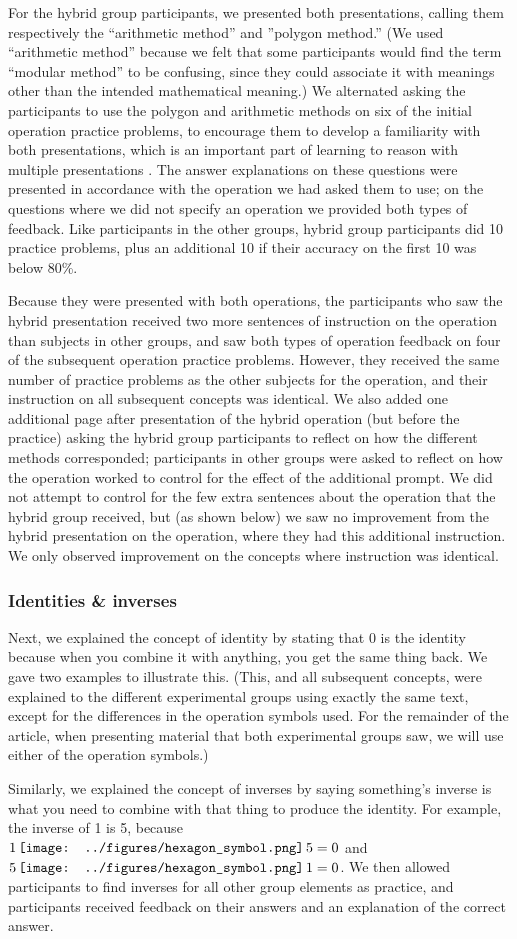 \documentclass[man,10pt]{apa6}
\newcommand{\hex}{\,\vcenter{\hbox{\texttt{[image: ../figures/hexagon\_symbol.png]}}}\,}
\begin{document}
For the hybrid group participants, we presented both presentations, calling them respectively the ``arithmetic method'' and ''polygon method.'' (We used ``arithmetic method'' because we felt that some participants would find the term ``modular method'' to be confusing, since they could associate it with meanings other than the intended mathematical meaning.) We alternated asking the participants to use the polygon and arithmetic methods on six of the initial operation practice problems, to encourage them to develop a familiarity with both presentations, which is an important part of learning to reason with multiple presentations \cite{Ainsworth2006}. The answer explanations on these questions were presented in accordance with the operation we had asked them to use; on the questions where we did not specify an operation we provided both types of feedback. Like participants in the other groups, hybrid group participants did 10 practice problems, plus an additional 10 if their accuracy on the first 10 was below 80\%. \par
Because they were presented with both operations, the participants who saw the hybrid presentation received two more sentences of instruction on the operation than subjects in other groups, and saw both types of operation feedback on four of the subsequent operation practice problems. However, they received the same number of practice problems as the other subjects for the operation, and their instruction on all subsequent concepts was identical. We also added one additional page after presentation of the hybrid operation (but before the practice) asking the hybrid group participants to reflect on how the different methods corresponded; participants in other groups were asked to reflect on how the operation worked to control for the effect of the additional prompt. We did not attempt to control for the few extra sentences about the operation that the hybrid group received, but (as shown below) we saw no improvement from the hybrid presentation on the operation, where they had this additional instruction. We only observed improvement on the concepts where instruction was identical.\par 
\subsubsection{Identities \& inverses}
Next, we explained the concept of identity by stating that 0 is the identity because when you combine it with anything, you get the same thing back. We gave two examples to illustrate this. (This, and all subsequent concepts, were explained to the different experimental groups using exactly the same text, except for the differences in the operation symbols used. For the remainder of the article, when presenting material that both experimental groups saw, we will use either of the operation symbols.)\par
Similarly, we explained the concept of inverses by saying something's inverse is what you need to combine with that thing to produce the identity. For example, the inverse of 1 is 5, because $1 \hex 5 = 0$ and $5 \hex 1 = 0$. We then allowed participants to find inverses for all other group elements as practice, and participants received feedback on their answers and an explanation of the correct answer.
\end{document}
